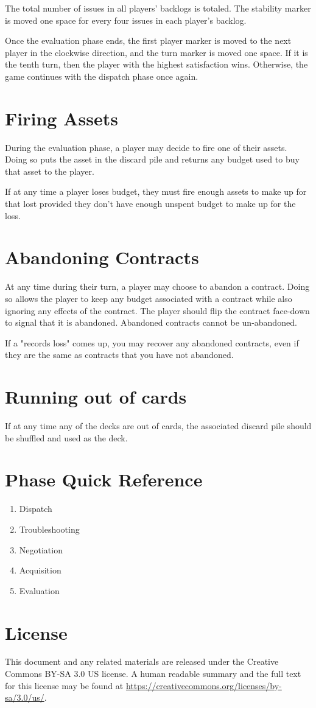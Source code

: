 \documentclass[twocolumn]{article}
\begin{document}
The total number of issues in all players' backlogs is totaled. The stability marker is moved one space for every four issues in each player's backlog.

Once the evaluation phase ends, the first player marker is moved to the next player in the clockwise direction, and the turn marker is moved one space. If it is the tenth turn, then the player with the highest satisfaction wins. Otherwise, the game continues with the dispatch phase once again.

\section*{Firing Assets}

During the evaluation phase, a player may decide to fire one of their assets. Doing so puts the asset in the discard pile and returns any budget used to buy that asset to the player.

If at any time a player loses budget, they must fire enough assets to make up for that lost provided they don't have enough unspent budget to make up for the loss.

\section*{Abandoning Contracts}

At any time during their turn, a player may choose to abandon a contract. Doing so allows the player to keep any budget associated with a contract while also ignoring any effects of the contract. The player should flip the contract face-down to signal that it is abandoned. Abandoned contracts cannot be un-abandoned.

If a "records loss" comes up, you may recover any abandoned contracts, even if they are the same as contracts that you have not abandoned.

\section*{Running out of cards}

If at any time any of the decks are out of cards, the associated discard pile should be shuffled and used as the deck.

\section*{Phase Quick Reference}

\begin{enumerate}
	\item Dispatch
	\item Troubleshooting
	\item Negotiation
	\item Acquisition
	\item Evaluation
\end{enumerate}

\section*{License}

This document and any related materials are released under the Creative Commons BY-SA 3.0 US license. A human readable summary and the full text for this license may be found at \url{https://creativecommons.org/licenses/by-sa/3.0/us/}.
\end{document}
